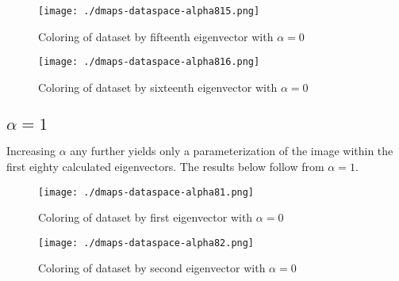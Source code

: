 \documentclass[11pt]{article}
\begin{document}
\begin{figure}[htbp]
  \centering
  \texttt{[image: ./dmaps-dataspace-alpha815.png]}
  \caption{Coloring of dataset by fifteenth eigenvector with $\alpha=0$}
\end{figure}

\begin{figure}[htbp]
  \centering
  \texttt{[image: ./dmaps-dataspace-alpha816.png]}
  \caption{Coloring of dataset by sixteenth eigenvector with $\alpha=0$}
\end{figure}

\clearpage

\subsection{$\alpha=1$}

Increasing $\alpha$ any further yields only a parameterization of the
image within the first eighty calculated eigenvectors. The results
below follow from $\alpha=1$.

\begin{figure}[htbp]
  \centering
  \texttt{[image: ./dmaps-dataspace-alpha81.png]}
  \caption{Coloring of dataset by first eigenvector with $\alpha=0$}
\end{figure}

\begin{figure}[htbp]
  \centering
  \texttt{[image: ./dmaps-dataspace-alpha82.png]}
  \caption{Coloring of dataset by second eigenvector with $\alpha=0$}
\end{figure}

% 
% 
\end{document}
